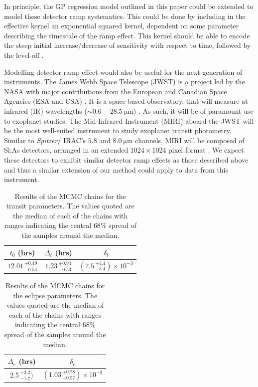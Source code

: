 \documentclass[twocolumn]{aastex61}
\begin{document}
In principle, the GP regression model outlined in this paper could be extended to model these detector ramp systematics. This could be done by including in the effective kernel an exponential squared kernel, dependent on some parameter describing the timescale of the ramp effect. This kernel should be able to encode the steep initial increase/decrease of sensitivity with respect to time, followed by the level-off \citep{evans2015}.

Modelling detector ramp effect would also be useful for the next generation of instruments. The James Webb Space Telescope (JWST) is a project led by the NASA with major contributions from the European and Canadian Space Agencies (ESA and CSA) \citep{gardner2006}. It is a space-based observatory, that will measure at infrared (IR) wavelengths ($\sim 0.6 - 28.5~\mathrm{\mu m}$) \citep{gardner2006}. As such, it will be of paramount use to exoplanet studies. The Mid-Infrared Instrument (MIRI) aboard the JWST will be the most well-suited instrument to study exoplanet transit photometry. Similar to \textit{Spitzer}/ IRAC's $5.8$ and $8.0~\mathrm{\mu m}$ channels, MIRI will be composed of Si:As detectors, arranged in an extended $1024\times 1024$ pixel format \citep{rieke2015}. We expect these detectors to exhibit similar detector ramp effects as those described above and thus a similar extension of our method could apply to data from this instrument.

\begin{table}[h!]
\centering
\caption{\small Results of the MCMC chains for the transit parameters. The values quoted are the median of each of the chains with ranges indicating the central $68\%$ spread of the samples around the median.}
\label{tbl:transitvalues}
\begin{tabular}{lll}
\multicolumn{1}{c}{$t_{0}$ (hrs)}      & \multicolumn{1}{c}{$\Delta_{t}$ (hrs)}     & \multicolumn{1}{c}{$\delta_{t}$} \\
\hline
\multicolumn{1}{c}{$12.01\,^{+0.49}_{-0.54}$} & \multicolumn{1}{c}{$1.23\,^{+0.94}_{-0.53}$} & \multicolumn{1}{c}{$(7.5\,^{+4.4}_{-3.4})\times 10^{-3}$}
\end{tabular}
\end{table}

\begin{table}[h!]
\centering
\caption{\small Results of the MCMC chains for the eclipse parameters. The values quoted are the median of each of the chains with ranges indicating the central $68\%$ spread of the samples around the median.}
\label{tbl:eclvalues}
\begin{tabular}{ll}
\multicolumn{1}{c}{$\Delta_{e}$ (hrs)}     & \multicolumn{1}{c}{$\delta_{e}$} \\
\hline
\multicolumn{1}{c}{$2.5\,^{+3.2}_{-1.7})$} & \multicolumn{1}{c}{$(1.03\,^{+0.78}_{-0.57})\times 10^{-3}$}
\end{tabular}
\end{table}
\end{document}
